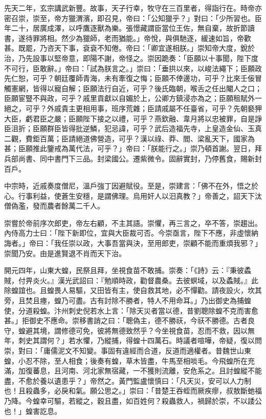 \begin{pinyinscope}
 先天二年，玄宗講武新豐。故事，天子行幸，牧守在三百里者，得詣行在。時帝亦密召崇，崇至，帝方獵渭濱，即召見，帝曰：「公知獵乎？」對曰：「少所習也。臣年二十，居廣成澤，以呼鷹逐獸為樂。張憬藏謂臣當位王佐，無自棄，故折節讀書，遂待罪將相。然少為獵師，老而猶能。」帝悅，與俱馳逐，緩速如旨，帝歡甚。既罷，乃咨天下事，袞袞不知倦。帝曰：「卿宜遂相朕。」崇知帝大度，銳於治，乃先設事以堅帝意，即陽不謝，帝怪之。崇因跪奏：「臣願以十事聞，陛下度不可行，臣敢辭。」帝曰：「試為朕言之。」崇曰：「垂拱以來，以峻法繩下；臣願政先仁恕，可乎？朝廷覆師青海，未有牽復之悔；臣願不倖邊功，可乎？比來壬佞冒觸憲網，皆得以寵自解；臣願法行自近，可乎？後氏臨朝，喉舌之任出閹人之口；臣願宦豎不與政，可乎？戚里貢獻以自媚於上，公卿方鎮浸亦為之；臣願租賦外一絕之，可乎？外戚貴主更相用事，班序荒雜；臣請戚屬不任臺省，可乎？先朝褻狎大臣，虧君臣之嚴；臣願陛下接之以禮，可乎？燕欽融、韋月將以忠被罪，自是諍臣沮折；臣願群臣皆得批逆鱗，犯忌諱，可乎？武后造福先寺，上皇造金仙、玉真二觀，費鉅百萬；臣請絕道佛營造，可乎？漢以祿、莽、閻、梁亂天下，國家為甚；臣願推此鑒戒為萬代法，可乎？」帝曰：「朕能行之。」崇乃頓首謝。翌日，拜兵部尚書、同中書門下三品。封梁國公。遷紫微令。固辭實封，乃停舊食，賜新封百戶。



 中宗時，近戚奏度僧尼，溫戶強丁因避賦役。至是，崇建言：「佛不在外，悟之於心。行事利益，使蒼生安穩，是謂佛理。烏用奸人以汨真教？」帝善之，詔天下汰僧偽濫，發而農者餘萬二千人。



 崇嘗於帝前序次郎吏，帝左右顧，不主其語。崇懼，再三言之，卒不答，崇趨出。內侍高力士曰：「陛下新即位，宜與大臣裁可否。今崇亟言，陛下不應，非虛懷納誨者。」帝曰：「我任崇以政，大事吾當與決，至用郎吏，崇顧不能而重煩我邪？」崇聞乃安。由是進賢退不肖而天下治。



 開元四年，山東大蝗，民祭且拜，坐視食苗不敢捕。崇奏：「《詩》云：『秉彼蟊賊，付畀炎火。』漢光武詔曰：『勉順時政，勸督農桑。去彼螟域，以及蟊賊。』此除蝗誼也。且蝗畏人易驅，又田皆有主，使自救其地，必不憚勸。請夜設火，坎其旁，且焚且瘞，蝗乃可盡。古有討除不勝者，特人不用命耳。」乃出御史為捕蝗使，分道殺蝗。汴州刺史倪若水上言：「除天災者當以德，昔劉聰除蝗不克而害愈甚。」拒御史不應命。崇移書誚之曰：「聰偽主，德不勝祆，今祆不勝德。古者良守，蝗避其境，謂修德可免，彼將無德致然乎？今坐視食苗，忍而不救，因以無年，刺史其謂何？」若水懼，乃縱捕，得蝗十四萬石。時議者喧嘩，帝疑，復以問崇，對曰：「庸儒泥文不知變。事固有違經而合道，反道而適權者。昔魏世山東蝗，小忍不除，至人相食；後奏有蝗，草木皆盡，牛馬至相啖毛。今飛蝗所在充滿，加復蕃息，且河南、河北家無宿藏，一不獲則流離，安危系之。且討蝗縱不能盡，不愈於養以遺患乎？」帝然之。黃門監盧懷慎曰：「凡天災，安可以人力制也！且殺蟲多，必戾和氣。願公思之。」崇曰：「昔楚王吞蛭而厥疾瘳，叔敖斷虵福乃降。今蝗幸可驅，若縱之，穀且盡，如百姓何？殺蟲救人，禍歸於崇，不以諉公也！」蝗害訖息。



\end{pinyinscope}
